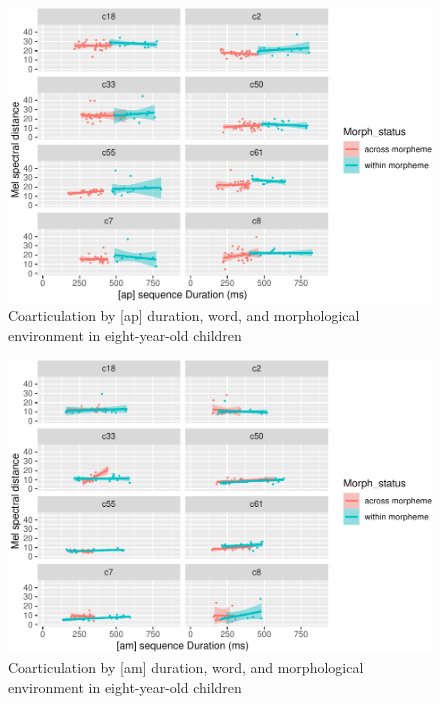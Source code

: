 \documentclass[
]{article}
\begin{document}
\begin{figure}
\centering
\includegraphics{3_ch3_results_files/figure-latex/eight-facet-ap-1.pdf}
\caption{\label{fig:eight-facet-ap}Coarticulation by {[}ap{]} duration, word, and morphological environment in eight-year-old children}
\end{figure}

\begin{figure}
\centering
\includegraphics{3_ch3_results_files/figure-latex/eight-facet-am-1.pdf}
\caption{\label{fig:eight-facet-am}Coarticulation by {[}am{]} duration, word, and morphological environment in eight-year-old children}
\end{figure}
\end{document}
